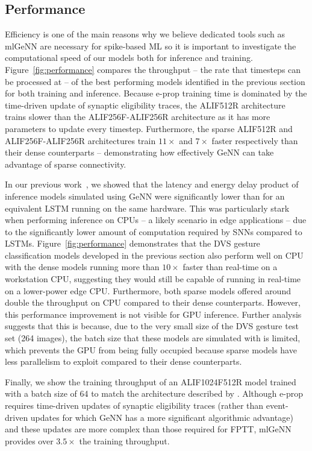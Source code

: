 \documentclass[sigconf]{acmart}
\begin{document}
\subsection{Performance}
Efficiency is one of the main reasons why we believe dedicated tools such as mlGeNN are necessary for spike-based ML so it is important to investigate the computational speed of our models both for inference and training.
Figure~\ref{fig:performance} compares the throughput -- the rate that timesteps can be processed at -- of the best performing models identified in the previous section for both training and inference.
Because e-prop training time is dominated by the time-driven update of synaptic eligibility traces, the ALIF512R architecture trains slower than the ALIF256F-ALIF256R architecture as it has more parameters to update every timestep.
Furthermore, the sparse ALIF512R and ALIF256F-ALIF256R architectures train $11\times$ and $7\times$ faster respectively than their dense counterparts -- demonstrating how effectively GeNN can take advantage of sparse connectivity.

In our previous work~\citep{Knight2022}, we showed that the latency and energy delay product of inference models simulated using GeNN were significantly lower than for an equivalent LSTM running on the same hardware.
This was particularly stark when performing inference on CPUs -- a likely scenario in edge applications -- due to the significantly lower amount of computation required by SNNs compared to LSTMs.
Figure~\ref{fig:performance} demonstrates that the DVS gesture classification models developed in the previous section also perform well on CPU with the dense models running more than $10\times$ faster than real-time on a workstation CPU, suggesting they would still be capable of running in real-time on a lower-power edge CPU.
Furthermore, both sparse models offered around double the throughput on CPU compared to their dense counterparts.
However, this performance improvement is not visible for GPU inference.
Further analysis suggests that this is because, due to the very small size of the DVS gesture test set (\num{264} images), the batch size that these models are simulated with is limited, which prevents the GPU from being fully occupied because sparse models have less parallelism to exploit compared to their dense counterparts. 

Finally, we show the training throughput of an ALIF1024F512R model trained with a batch size of \num{64} to match the architecture described by \citet{yin2021accurate}.
Although e-prop requires time-driven updates of synaptic eligibility traces (rather than event-driven updates for which GeNN has a more significant algorithmic advantage) and these updates are more complex than those required for FPTT, mlGeNN provides over $3.5\times$ the training throughput.
\end{document}
